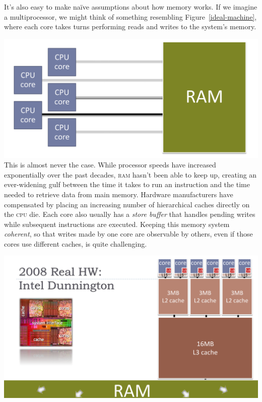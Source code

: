 \documentclass[fontsize=10pt, numbers=endperiod]{scrartcl}
\newcommand{\fig}[1]{Figure~\ref{#1}}
\newcommand{\introduce}[1]{\textit{#1}}
\newenvironment{colfigure}
  {\par\vspace{1\baselineskip minus 0.5\baselineskip}\noindent\minipage{\linewidth}}
  {\endminipage\vspace*{1\baselineskip minus 0.7\baselineskip}}
\begin{document}
\begin{multicols}{2}
It's also easy to make naïve assumptions about how memory works.
If we imagine a multiprocessor,
we might think of something resembling \fig{ideal-machine},
where each core takes turns performing reads and writes to the system's memory.
\begin{colfigure}
\centering
\includegraphics[keepaspectratio, width=0.8\linewidth]{ideal-machine}
\label{ideal-machine}
\end{colfigure}
This is almost never the case.
While processor speeds have increased exponentially over the past decades,
\textsc{ram} hasn't been able to keep up,
creating an ever-widening gulf between the time it takes to run an
instruction and the time needed to retrieve data from main memory.
Hardware manufacturers have compensated by placing an increasing number of
hierarchical caches directly on the \textsc{cpu} die.
Each core also usually has a \introduce{store buffer} that handles
pending writes while subsequent instructions are executed.
Keeping this memory system \introduce{coherent},
so that writes made by one core are observable by others,
even if those cores use different caches,
is quite challenging.

\begin{colfigure}
\centering
\includegraphics[keepaspectratio, width=\linewidth]{actual-machine}
\label{dunnington}
\end{colfigure}


\end{multicols}
\end{document}
